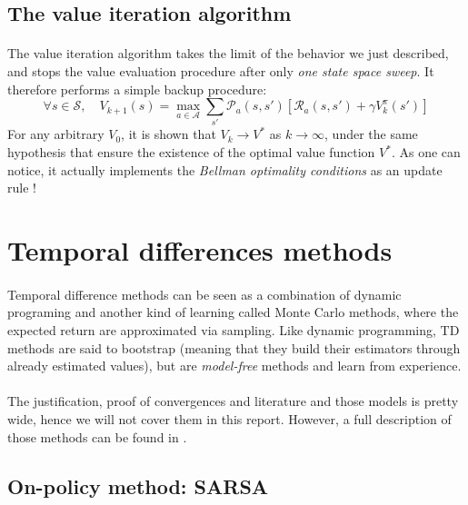 \documentclass[a4paper]{report}
\begin{document}
{{			\subsection{The value iteration algorithm}
			{
				\paragraph{} The value iteration algorithm takes the limit of the behavior we just described, and stops the value evaluation procedure after only \emph{one state space sweep}. It therefore performs a simple backup procedure: 
					\begin{equation}
						\forall{s}\in\mathcal{S}, \quad V_{k+1}(s)  = \max_{a\in\mathcal{A}}  \sum_{s'}\mathcal{P}_a(s,s')\left[\mathcal{R}_a(s,s') + \gamma V_k^\pi(s')\right]
					\end{equation}
					For any arbitrary $V_0$, it is shown that $V_k\to V^*$ as $k\to\infty$, under the same hypothesis that ensure the existence of the optimal value function $V^*$. As one can notice, it actually implements the \emph{Bellman optimality conditions} as an update rule !
				}
			}
		
		
		\section{Temporal differences methods}
		{
			\paragraph{} Temporal difference methods can be seen as a combination of dynamic programing and another kind of learning called Monte Carlo methods, where the expected return are approximated via sampling. Like dynamic programming, TD methods are said to bootstrap (meaning that they build their estimators through already estimated values), but are \emph{model-free} methods and learn from experience. 
			
			\paragraph{} The justification, proof of convergences and literature and those models is pretty wide, hence we will not cover them in this report. However, a full description of those methods can be found in \cite{Sutton98a}. 
			
			\subsection{On-policy method: SARSA}
			{
}}}
\end{document}

